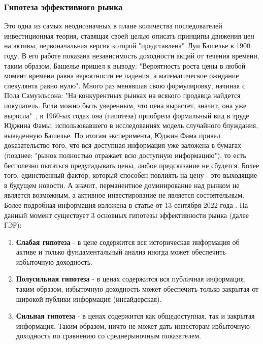 		\subsubsection{Гипотеза эффективного рынка} \label{link::hypothsis_of_msrket_efficiency}
			Это одна из самых неоднозначных в плане количества последователей инвестиционная теория, ставящая своей целью описать принципы движения цен на активы, первоначальная версия которой "представлена"\ Луи Башелье в 1900 году. В его работе показана независимость доходности акций от течения времени, таким образом, Башелье пришел к выводу: "Вероятность роста цены в любой момент времени равна вероятности ее падения, а математическое ожидание спекулянта равно нулю". Много раз менявшая свою формулировку, начиная с Пола Самуэльсона: "На конкурентных рынках на всякого продавца найдется покупатель. Если можно быть уверенным, что цена вырастет, значит, она уже выросла"\ ,  в 1960-ых годах она (гипотеза) приобрела формальный вид в труде Юджина Фамы, использовавшего в исследованиях модель случайного блуждания, выведенную Башелье. По итогам эксперимента, Юджин Фама \cite{efficient_market} привел доказательство того, что вся доступная информация уже заложена в бумагах (позднее: "рынок полностью отражает всю доступную информацию"), то есть бесполезно пытаться предугадывать цены, любое предсказание не сбудется. Более того, единственный фактор, который способен повлиять на цену - это выходящие в будущем новости. А значит, перманентное доминирование над рынком не является возможным, а активное инвестирование не является состоятельным. Более подробная информация изложена в статье от 13 сентября 2022 года \cite{fama_market_efficiency}. На данный момент существует 3 основных гипотезы эффективности рынка (далее ГЭР):
			\begin{enumerate}
				\item \textbf{Слабая гипотеза} - в цене содержится вся историческая информация об активе и только фундаментальный анализ иногда может обеспечить избыточную доходность.
				\item \textbf{Полусильная гипотеза} - в ценах содержится вся публичная информация, таким образом, избыточную доходность может обеспечить только закрытая от широкой публики информация (инсайдерская).
				\item \textbf{Сильная гипотеза} - в ценах содержится как общедоступная, так и закрытая информация. Таким образом, ничто не может дать инвесторам избыточную доходность по сравнению со среднерыночным показателем.
			\end{enumerate}
